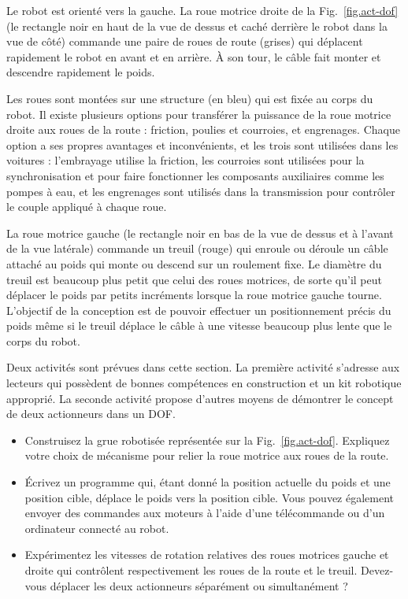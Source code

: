 Le robot est orienté vers la gauche. La roue motrice droite de la Fig.~\ref{fig.act-dof} (le rectangle noir en haut de la vue de dessus et caché derrière le robot dans la vue de côté) commande une paire de roues de route (grises) qui déplacent rapidement le robot en avant et en arrière. À son tour, le câble fait monter et descendre rapidement le poids.

Les roues sont montées sur une structure (en bleu) qui est fixée au corps du robot. Il existe plusieurs options pour transférer la puissance de la roue motrice droite aux roues de la route : friction, poulies et courroies, et engrenages. Chaque option a ses propres avantages et inconvénients, et les trois sont utilisées dans les voitures : l'embrayage utilise la friction, les courroies sont utilisées pour la synchronisation et pour faire fonctionner les composants auxiliaires comme les pompes à eau, et les engrenages sont utilisés dans la transmission pour contrôler le couple appliqué à chaque roue.

La roue motrice gauche (le rectangle noir en bas de la vue de dessus et à l'avant de la vue latérale) commande un treuil (rouge) qui enroule ou déroule un câble attaché au poids qui monte ou descend sur un roulement fixe. Le diamètre du treuil est beaucoup plus petit que celui des roues motrices, de sorte qu'il peut déplacer le poids par petits incréments lorsque la roue motrice gauche tourne. L'objectif de la conception est de pouvoir effectuer un positionnement précis du poids même si le treuil déplace le câble à une vitesse beaucoup plus lente que le corps du robot.

Deux activités sont prévues dans cette section. La première activité s'adresse aux lecteurs qui possèdent de bonnes compétences en construction et un kit robotique approprié. La seconde activité propose d'autres moyens de démontrer le concept de deux actionneurs dans un DOF.

\begin{framed}
\begin{itemize}
\item Construisez la grue robotisée représentée sur la Fig.~\ref{fig.act-dof}. Expliquez votre choix de mécanisme pour relier la roue motrice aux roues de la route.
\item Écrivez un programme qui, étant donné la position actuelle du poids et une position cible, déplace le poids vers la position cible. Vous pouvez également envoyer des commandes aux moteurs à l'aide d'une télécommande ou d'un ordinateur connecté au robot.
\item Expérimentez les vitesses de rotation relatives des roues motrices gauche et droite qui contrôlent respectivement les roues de la route et le treuil. Devez-vous déplacer les deux actionneurs séparément ou simultanément ?
\end{itemize}
\end{framed}

